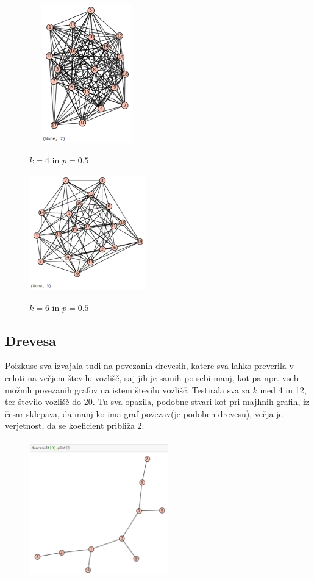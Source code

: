 \documentclass[a4paper]{article}
\begin{document}
\begin{figure}[h!]
    \caption*{$k=4$ in $p=0.5$}
    \centering
    \includegraphics[width=5cm, height=6cm]{Slika5}
    \label{fig:mesh1}
\end{figure}

\begin{figure}[h!]
    \caption*{$k=6$ in $p=0.5$}
    \centering
    \includegraphics[width=5cm, height=5cm]{Slika13}
    \label{fig:mesh1}
\end{figure}

\clearpage

\subsection{Drevesa}

Poizkuse sva izvajala tudi na povezanih drevesih, katere sva lahko preverila v celoti na večjem številu vozlišč, saj jih je samih po sebi manj, kot pa npr. vseh možnih povezanih grafov na istem številu vozlišč. Testirala sva za $k$ med 4 in 12, ter število vozlišč do 20. Tu sva opazila, podobne stvari kot pri majhnih grafih, iz česar sklepava, da manj ko ima graf povezav(je podoben drevesu), večja je verjetnost, da se koeficient približa 2.\\

\begin{figure}[h!]
    \centering
    \includegraphics[width=6cm, height=6cm]{Slika16}
    \label{fig:mesh1}
\end{figure}
\end{document}

